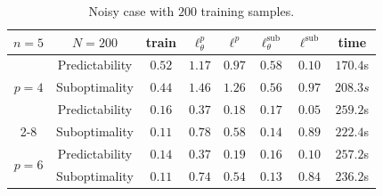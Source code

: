 \documentclass{article}
\theoremstyle{plain}
\begin{document}
\begin{table}[h!]
\caption{Noisy case with $200$ training samples.}\label{tab:multicol:bilinear:noise200}
\begin{center}
\small{
\begin{tabular}{|c|c|c|c|c|c|c|c|}
    \hline
   $n=5$ & $N=200$ & train &$\ell_\theta^p$ & $\ell^p$ &  $\ell_\theta^\text{sub}$ &  $\ell^\text{sub}$ & time \\
    \hline
    \multirow{3}{*}{$p=4$}& Predictability & $0.52$ & $1.17$ & $0.97$ & $0.58$ & $0.10$ & $170.4$s \\
       \cline{2-8}
       & Suboptimality & $0.44$ & $1.46$ & $1.26$ & $0.56$ & $0.97$ & $208.3s$\\
    \hline
    \hline
    \multirow{3}{*}{$p=5$}& Predictability & $0.16$ &  $0.37$ & $0.18$ & $0.17$ & $0.05$ & $259.2$s \\
       \cline{2-8}
       & Suboptimality & $0.11$ & $0.78$ & $0.58$ & $0.14$ & $0.89$ & $222.4$s\\
    \hline
    \hline
    \multirow{3}{*}{$p=6$}& Predictability & $0.14$ &  $0.37$ & $0.19$ & $0.16$ & $0.10$ & $257.2$s \\
    \cline{2-8}
       &Suboptimality & $0.11$ & $0.74$ & $0.54$ & $0.13$ & $0.84$ & $236.2$s\\
    \hline
\end{tabular}}
\end{center}
\vskip -0.1in
\end{table}
\end{document}
